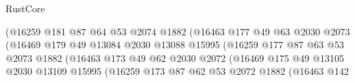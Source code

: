 \begin{lexlean}{RustCore}
\begin{coremodule}
                                        (@16259
                                          @181
                                          @87
                                          @64
                                          @53
                                          @2074
                                          @1882
                                          (@16463
                                            @177
                                            @49
                                            @63
                                            @2030
                                            @2073
                                            (@16469
                                              @179
                                              @49
                                              @13084
                                              @2030
                                              @13088
                                              @15995
                                              (@16259
                                                @177
                                                @87
                                                @63
                                                @53
                                                @2073
                                                @1882
                                                (@16463
                                                  @173
                                                  @49
                                                  @62
                                                  @2030
                                                  @2072
                                                  (@16469
                                                    @175
                                                    @49
                                                    @13105
                                                    @2030
                                                    @13109
                                                    @15995
                                                    (@16259
                                                      @173
                                                      @87
                                                      @62
                                                      @53
                                                      @2072
                                                      @1882
                                                      (@16463
                                                        @142

\end{coremodule}
\end{lexlean}
